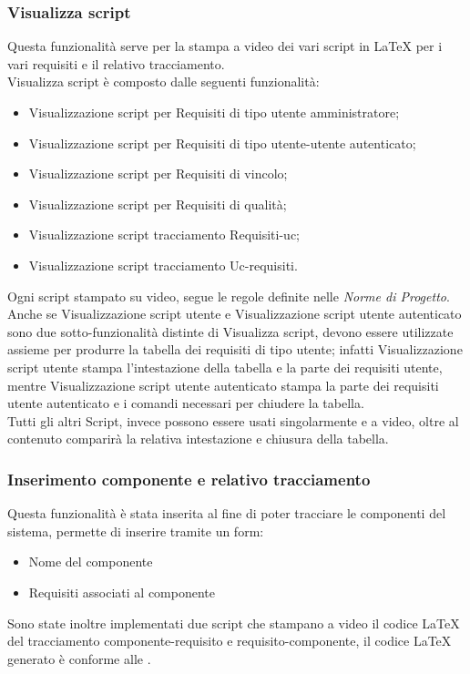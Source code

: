 \subsubsection{Visualizza script}
Questa funzionalità serve per la stampa a video dei vari script in \LaTeX{} per i vari requisiti e il relativo tracciamento.\\ Visualizza script è composto dalle seguenti funzionalità:
	\begin{itemize}
		\item Visualizzazione script per Requisiti di tipo utente amministratore;
		\item Visualizzazione script per Requisiti di tipo utente-utente autenticato;
		\item Visualizzazione script per Requisiti di vincolo;
		\item Visualizzazione script per Requisiti di qualità;
		\item Visualizzazione script tracciamento Requisiti-uc;
		\item Visualizzazione script tracciamento Uc-requisiti.
	\end{itemize}
Ogni script stampato su video, segue le regole definite nelle \textit{Norme di Progetto}.\\
Anche se Visualizzazione script utente e Visualizzazione script utente autenticato sono due sotto-funzionalità distinte di Visualizza script, devono essere utilizzate assieme per produrre la tabella dei requisiti di tipo utente; infatti Visualizzazione script utente stampa l'intestazione della tabella e la parte dei requisiti utente, mentre Visualizzazione script utente autenticato stampa la parte dei requisiti utente autenticato e i comandi necessari per chiudere la tabella.\\
Tutti gli altri Script, invece possono essere usati singolarmente e a video, oltre al contenuto comparirà la relativa intestazione e chiusura della tabella.
\subsubsection{Inserimento componente e relativo tracciamento}
Questa funzionalità è stata inserita al fine di poter tracciare le componenti del sistema, permette di inserire tramite un form:
\begin{itemize}
\item Nome del componente
\item Requisiti associati al componente
\end{itemize}
Sono state inoltre implementati due script che stampano a video il codice \LaTeX{} del tracciamento componente-requisito e requisito-componente, il codice \LaTeX{} generato è conforme alle \NormeDiProgetto{}.

